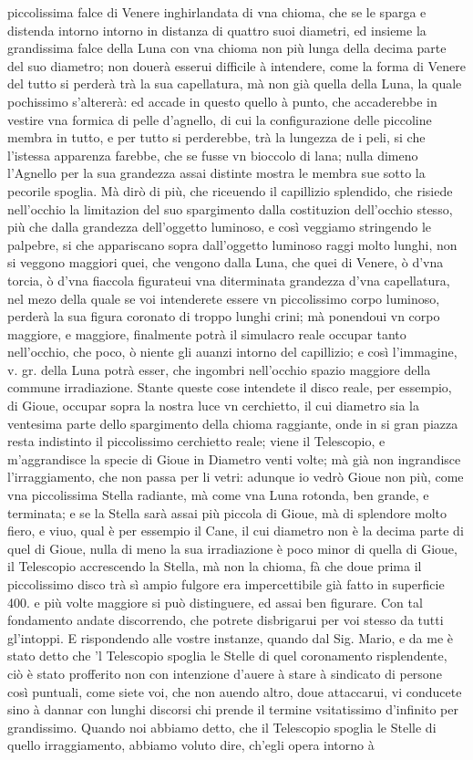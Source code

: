 \documentclass[11pt,twoside,openany]{book}
\begin{document}
piccolissima falce di Venere inghirlandata di vna chioma, che se le sparga e distenda intorno intorno in distanza di quattro suoi diametri, ed insieme la grandissima falce della Luna con vna chioma non più lunga della decima parte del suo diametro; non douerà esserui difficile à intendere, come la forma di Venere del tutto si perderà trà la sua capellatura, mà non già quella della Luna, la quale pochissimo s'altererà: ed accade in questo quello à punto, che accaderebbe in vestire vna formica di pelle d'agnello, di cui la configurazione delle piccoline membra in tutto, e per tutto si perderebbe, trà la lungezza de i peli, si che l'istessa apparenza farebbe, che se fusse vn bioccolo di lana; nulla dimeno l'Agnello per la sua grandezza assai distinte mostra le membra sue sotto la pecorile spoglia. Mà dirò di più, che riceuendo il capillizio splendido, che risiede nell'occhio la limitazion del suo spargimento dalla costituzion dell'occhio stesso, più che dalla grandezza dell'oggetto luminoso, e così veggiamo stringendo le palpebre, si che appariscano sopra dall'oggetto luminoso raggi molto lunghi, non si veggono maggiori quei, che vengono dalla Luna, che quei di Venere, ò d'vna torcia, ò d'vna fiaccola figurateui vna diterminata grandezza d'vna capellatura, nel mezo della quale se voi intenderete essere vn piccolissimo corpo luminoso, perderà la sua figura coronato di troppo lunghi crini; mà ponendoui vn corpo maggiore, e maggiore, finalmente potrà il simulacro reale occupar tanto nell'occhio, che poco, ò niente gli auanzi intorno del capillizio; e così l'immagine, v. gr. della Luna potrà esser, che ingombri nell'occhio spazio maggiore della commune irradiazione. Stante queste cose intendete il disco reale, per essempio, di Gioue, occupar sopra la nostra luce vn cerchietto, il cui diametro sia la ventesima parte dello spargimento della chioma raggiante, onde in si gran piazza resta indistinto il piccolissimo cerchietto reale; viene il Telescopio, e m'aggrandisce la specie di Gioue in Diametro venti volte; mà già non ingrandisce l'irraggiamento, che non passa per li vetri: adunque io vedrò Gioue non più, come vna piccolissima Stella radiante, mà come vna Luna rotonda, ben grande, e terminata; e se la Stella sarà assai più piccola di Gioue, mà di splendore molto fiero, e viuo, qual è per essempio il Cane, il cui diametro non è la decima parte di quel di Gioue, nulla di meno la sua irradiazione è poco minor di quella di Gioue, il Telescopio accrescendo la Stella, mà non la chioma, fà che doue prima il piccolissimo disco trà sì ampio fulgore era impercettibile già fatto in superficie 400. e più volte maggiore si può distinguere, ed assai ben figurare. Con tal fondamento andate discorrendo, che potrete disbrigarui per voi stesso da tutti gl'intoppi. E rispondendo alle vostre instanze, quando dal Sig. Mario, e da me è stato detto che 'l Telescopio spoglia le Stelle di quel coronamento risplendente, ciò è stato profferito non con intenzione d'auere à stare à sindicato di persone così puntuali, come siete voi, che non auendo altro, doue attaccarui, vi conducete sino à dannar con lunghi discorsi chi prende il termine vsitatissimo d'infinito per grandissimo. Quando noi abbiamo detto, che il Telescopio spoglia le Stelle di quello irraggiamento, abbiamo voluto dire, ch'egli opera intorno à 
\end{document}
